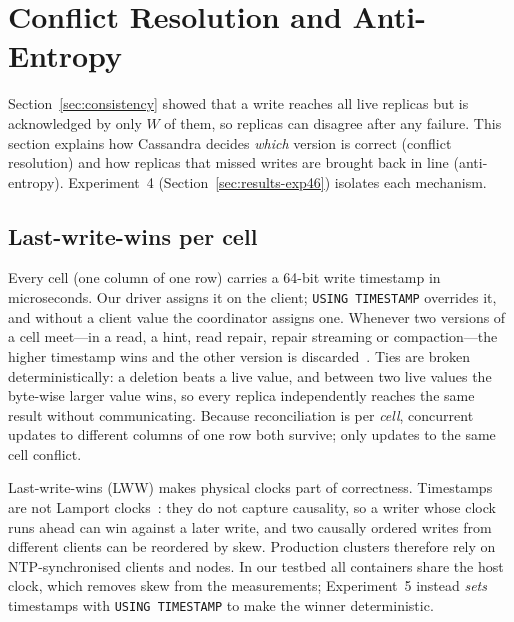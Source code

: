 \section{Conflict Resolution and Anti-Entropy}\label{sec:antientropy}

Section~\ref{sec:consistency} showed that a write reaches all live replicas but is
acknowledged by only $W$ of them, so replicas can disagree after any failure. This section
explains how Cassandra decides \emph{which} version is correct (conflict resolution) and how
replicas that missed writes are brought back in line (anti-entropy). Experiment~4
(Section~\ref{sec:results-exp46}) isolates each mechanism.

\subsection{Last-write-wins per cell}

Every cell (one column of one row) carries a 64-bit write timestamp in microseconds. Our
driver assigns it on the client; \texttt{USING TIMESTAMP} overrides it, and without a client
value the coordinator assigns one. Whenever two versions of a cell meet---in a read, a hint,
read repair, repair streaming or compaction---the higher timestamp wins and the other version
is discarded~\cite{lakshman2010cassandra,cassdoc-dynamo}. Ties are broken deterministically: a
deletion beats a live value, and between two live values the byte-wise larger value wins,
so every replica independently reaches the same result without communicating. Because
reconciliation is per \emph{cell}, concurrent updates to different columns of one row both
survive; only updates to the same cell conflict.

Last-write-wins (LWW) makes physical clocks part of correctness. Timestamps are not
Lamport clocks~\cite{lamport1978time}: they do not capture causality, so a writer whose clock
runs ahead can win against a later write, and two causally ordered writes from different
clients can be reordered by skew. Production clusters therefore rely on NTP-synchronised
clients and nodes. In our testbed all containers share the host clock, which removes skew
from the measurements; Experiment~5 instead \emph{sets} timestamps with \texttt{USING
TIMESTAMP} to make the winner deterministic.

